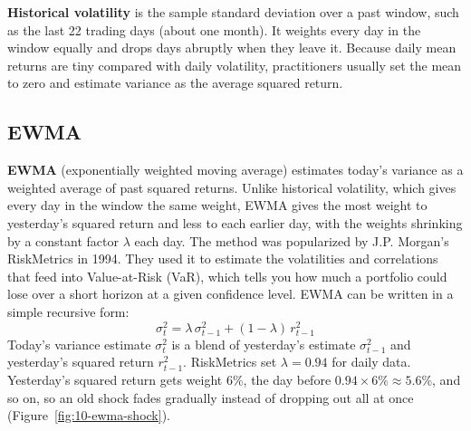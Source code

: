 \textbf{Historical volatility} is the sample standard deviation over a past window, such as the last 22 trading days (about one month). It weights every day in the window equally and drops days abruptly when they leave it. Because daily mean returns are tiny compared with daily volatility, practitioners usually set the mean to zero and estimate variance as the average squared return.

\subsection{EWMA}


\textbf{EWMA} (exponentially weighted moving average) estimates today's variance as a weighted average of past squared returns. Unlike historical volatility, which gives every day in the window the same weight, EWMA gives the most weight to yesterday's squared return and less to each earlier day, with the weights shrinking by a constant factor $\lambda$ each day. The method was popularized by J.P. Morgan's RiskMetrics in 1994.
They used it to estimate the volatilities and correlations that feed into Value-at-Risk (VaR), which tells you how much a portfolio could lose over a short horizon at a given confidence level.
EWMA can be written in a simple recursive form:
\begin{equation}
  \sigma^2_t = \lambda\,\sigma^2_{t-1} + (1 - \lambda)\,r^2_{t-1}
  \label{eq:10-ewma}
\end{equation}
Today's variance estimate $\sigma^2_t$ is a blend of yesterday's estimate $\sigma^2_{t-1}$ and yesterday's squared return $r^2_{t-1}$.
RiskMetrics set $\lambda = 0.94$ for daily data. Yesterday's squared return gets weight 6\%, the day before $0.94 \times 6\% \approx 5.6\%$, and so on, so an old shock fades gradually instead of dropping out all at once (Figure~\ref{fig:10-ewma-shock}).


